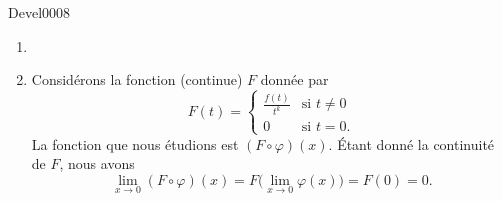 
\begin{corrige}{Devel0008}

\begin{enumerate}

\item
\item
Considérons la fonction (continue) $F$ donnée par
\begin{equation}
	F(t)=\begin{cases}
	\frac{ f(t) }{ t^k }	&	\text{si }t\neq 0\\
	0	&	 \text{si }t=0.
\end{cases}
\end{equation}
La fonction que nous étudions est $(F\circ \varphi)(x)$. Étant donné la continuité de $F$, nous avons
\begin{equation}
	\lim_{x\to 0} (F\circ\varphi)(x)=F\big( \lim_{x\to 0} \varphi(x) \big)=F(0)=0.
\end{equation}

\end{enumerate}


\end{corrige}
